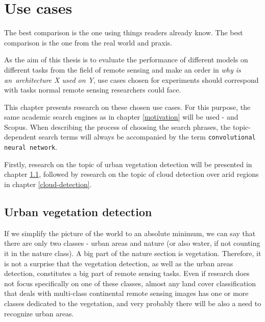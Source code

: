 \chapter{Use cases}
\label{use-cases}

The best comparison is the one using things readers already know. The best comparison is the one from the real world and praxis.

As the aim of this thesis is to evaluate the performance of different  models on different tasks from the field of remote sensing and make an order in \textit{why is an~architecture X used on Y}, use cases chosen for experiments should correspond with tasks normal remote sensing researchers could face.

This chapter presents research on these chosen use cases. For this purpose, the same academic search engines as in chapter \ref{motivation} will be used -  and Scopus. When describing the process of choosing the search phrases, the topic-dependent search terms will always be accompanied by the term \verb|convolutional neural network|.

Firstly, research on the topic of urban vegetation detection will be presented in chapter \ref{urban-green}, followed by research on the topic of cloud detection over arid regions in chapter \ref{cloud-detection}.

\section{Urban vegetation detection}
\label{urban-green}

If we simplify the picture of the world to an absolute minimum, we can say that there are only two classes - urban areas and nature (or also water, if not counting it in the nature class). A big part of the nature section is vegetation. Therefore, it is not a surprise that the vegetation detection, as well as the urban areas detection, constitutes a big part of remote sensing tasks. Even if research does not focus specifically on one of these classes, almost any land cover classification that deals with multi-class continental remote sensing images has one or more classes dedicated to the vegetation, and very probably there will be also a need to recognize urban areas.

